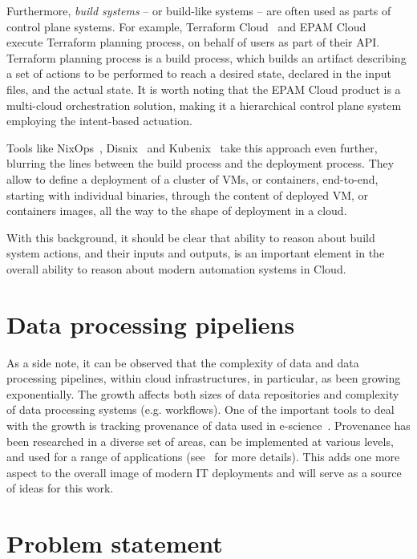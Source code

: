 Furthermore, \textit{build systems} -- or build-like systems -- are often used as parts of control plane systems. For example, Terraform Cloud~\cite{terraform-cloud-2020Aug} and EPAM Cloud~\cite{epamterraformasacloud} execute Terraform planning process, on behalf of users as part of their API. Terraform planning process is a build process, which builds an artifact describing a set of actions to be performed to reach a desired state, declared in the input files, and the actual state. It is worth noting that the EPAM Cloud product is a multi-cloud orchestration solution, making it a hierarchical control plane system employing the intent-based actuation.

Tools like NixOps~\cite{dolstra2013charon}, Disnix~\cite{disnix-vanderburg2014} and Kubenix~\cite{kubenix-xtruder2020Sep} take this approach even further, blurring the lines between the build process and the deployment process. They allow to define a deployment of a cluster of VMs, or containers, end-to-end, starting with individual binaries, through the content of deployed VM, or containers images, all the way to the shape of deployment in a cloud.

With this background, it should be clear that ability to reason about build system actions, and their inputs and outputs, is an important element in the overall ability to reason about modern automation systems in Cloud.

\section{Data processing pipeliens}

As a side note, it can be observed that the complexity of data and data processing pipelines, within cloud infrastructures, in particular, as been growing exponentially. The growth affects both sizes of data repositories and complexity of data processing systems (e.g. workflows). One of the important tools to deal with the growth is tracking provenance of data used in e-science~\cite{simmhan2005survey}. Provenance has been researched in a diverse set of areas, can be implemented at various levels, and used for a range of applications (see~\cite{herschel2017survey} for more details). This adds one more aspect to the overall image of modern IT deployments and will serve as a source of ideas for this work.

\section{Problem statement}\label{sec:problem}\label{sec:use-case}

